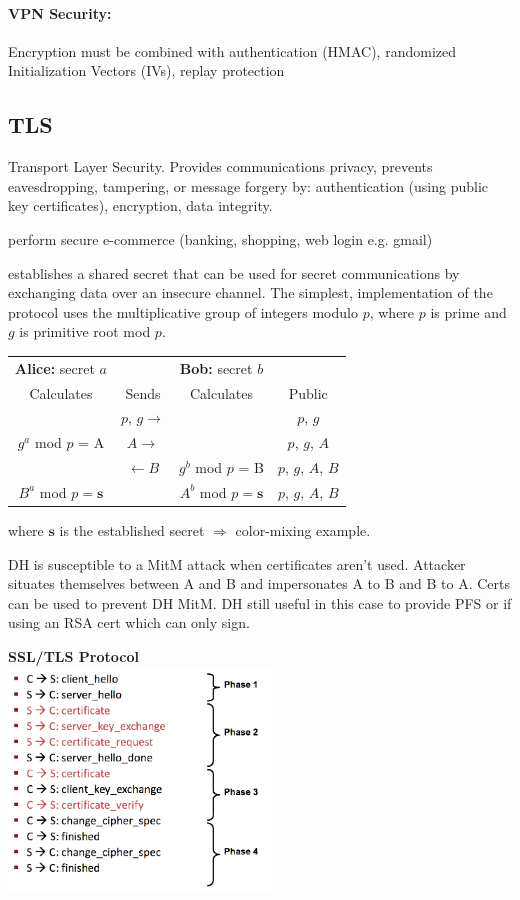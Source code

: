 \paragraph{VPN Security:} Encryption must be combined with authentication (HMAC), randomized Initialization Vectors (IVs), replay protection

\subsection{TLS}

Transport Layer Security. Provides communications privacy, prevents eavesdropping, tampering, or message forgery by: authentication (using public key certificates), encryption, data integrity.

 perform secure e-commerce (banking, shopping, web login e.g. gmail)

 establishes a shared secret that can be used for secret communications by exchanging data over an insecure channel. The simplest,  implementation of the protocol uses the multiplicative group of integers modulo $p$, where $p$ is prime and $g$ is primitive root mod $p$.

\begin{tabular}{ccc|c}
\multicolumn{1}{c}{\textbf{Alice:} secret $a$} & &  \multicolumn{1}{c}{\textbf{Bob:} secret $b$} & \\
Calculates & Sends & Calculates & Public \\
\hline
\hline
 & $p$, $g\to$ & & $p$, $g$ \\
$g^a$ mod $p$ = A & $A\to$ & & $p$, $g$, $A$ \\
 & $\leftarrow B$ &$g^b$ mod $p$ = B & $p$, $g$, $A$, $B$ \\
 $B^a$ mod $p = \mathbf{s}$ & & $A^b$ mod $p = \mathbf{s}$ & $p$, $g$, $A$, $B$ \\
\end{tabular}

where $\mathbf{s}$ is the established secret $\Rightarrow$ color-mixing example.

 DH is susceptible to a MitM attack when certificates aren't used. Attacker situates themselves between A and B and impersonates A to B and B to A. Certs can be used to prevent DH MitM. DH still useful in this case to provide PFS or if using an RSA cert which can only sign.

\textbf{SSL/TLS Protocol}\\
\includegraphics[width=7cm]{images/SSLProtocol}

